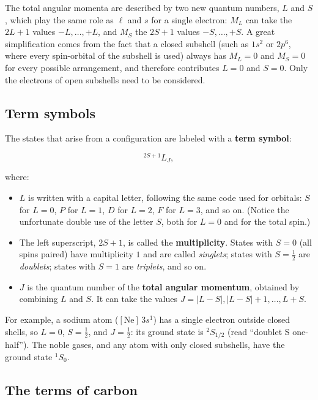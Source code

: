 \documentclass[
  english,
  9pt,
]{extbook}
\providecommand{\tightlist}{%
  \setlength{\itemsep}{0pt}\setlength{\parskip}{0pt}}
\theoremstyle{definition}
\theoremstyle{definition}
\theoremstyle{definition}
\theoremstyle{definition}
\theoremstyle{remark}
\begin{document}
The total angular momenta are described by two new quantum numbers, \(L\) and \(S\), which play the same role as \(\ell\) and \(s\) for a single electron: \(M_L\) can take the \(2L+1\) values \(-L,\ldots,+L\), and \(M_S\) the \(2S+1\) values \(-S,\ldots,+S\). A great simplification comes from the fact that a closed subshell (such as \(1s^2\) or \(2p^6\), where every spin-orbital of the subshell is used) always has \(M_L=0\) and \(M_S=0\) for every possible arrangement, and therefore contributes \(L=0\) and \(S=0\). Only the electrons of open subshells need to be considered.

\subsection{Term symbols}\label{term-symbols}

The states that arise from a configuration are labeled with a \textbf{term symbol}:

\begin{equation}
^{2S+1}L_J,
\label{eq:term2}
\end{equation}

where:

\begin{itemize}
\tightlist
\item
  \(L\) is written with a capital letter, following the same code used for orbitals: \(S\) for \(L=0\), \(P\) for \(L=1\), \(D\) for \(L=2\), \(F\) for \(L=3\), and so on. (Notice the unfortunate double use of the letter \(S\), both for \(L=0\) and for the total spin.)
\item
  The left superscript, \(2S+1\), is called the \textbf{multiplicity}. States with \(S=0\) (all spins paired) have multiplicity \(1\) and are called \emph{singlets}; states with \(S=\frac{1}{2}\) are \emph{doublets}; states with \(S=1\) are \emph{triplets}, and so on.
\item
  \(J\) is the quantum number of the \textbf{total angular momentum}, obtained by combining \(L\) and \(S\). It can take the values \(J=|L-S|, |L-S|+1, \ldots, L+S\).
\end{itemize}

For example, a sodium atom (\([\mathrm{Ne}]\,3s^1\)) has a single electron outside closed shells, so \(L=0\), \(S=\frac{1}{2}\), and \(J=\frac{1}{2}\): its ground state is \(^2S_{1/2}\) (read ``doublet S one-half''). The noble gases, and any atom with only closed subshells, have the ground state \(^1S_0\).

\subsection{The terms of carbon}\label{the-terms-of-carbon}
\end{document}
